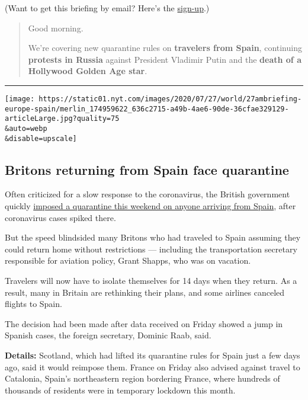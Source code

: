 (Want to get this briefing by email? Here's the
\href{https://www.nytimes.com/morning-briefing}{sign-up}.)

\begin{quote}
Good morning.

We're covering new quarantine rules on \textbf{travelers from Spain},
continuing \textbf{protests in Russia} against President Vladimir Putin
and the \textbf{death of a Hollywood Golden Age star}.
\end{quote}

\begin{center}\rule{0.5\linewidth}{\linethickness}\end{center}

\texttt{[image: https://static01.nyt.com/images/2020/07/27/world/27ambriefing-europe-spain/merlin\_174959622\_636c2715-a49b-4ae6-90de-36cfae329129-articleLarge.jpg?quality=75\\\&auto=webp\\\&disable=upscale]}

\hypertarget{britons-returning-from-spain-face-quarantine}{%
\subsection{Britons returning from Spain face
quarantine}\label{britons-returning-from-spain-face-quarantine}}

Often criticized for a slow response to the coronavirus, the British
government quickly
\href{https://www.nytimes.com/2020/07/26/world/europe/Spain-quarantine-UK-travel.html}{imposed
a quarantine this weekend on anyone arriving from Spain}, after
coronavirus cases spiked there.

But the speed blindsided many Britons who had traveled to Spain assuming
they could return home without restrictions --- including the
transportation secretary responsible for aviation policy, Grant Shapps,
who was on vacation.

Travelers will now have to isolate themselves for 14 days when they
return. As a result, many in Britain are rethinking their plans, and
some airlines canceled flights to Spain.

The decision had been made after data received on Friday showed a jump
in Spanish cases, the foreign secretary, Dominic Raab, said.

\textbf{Details:} Scotland, which had lifted its quarantine rules for
Spain just a few days ago, said it would reimpose them. France on Friday
also advised against travel to Catalonia, Spain's northeastern region
bordering France, where hundreds of thousands of residents were in
temporary lockdown this month.

